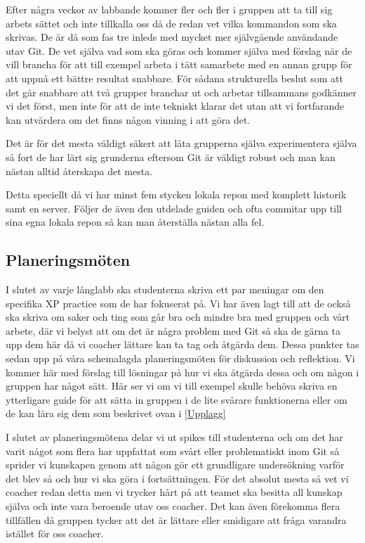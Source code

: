 Efter några veckor av labbande kommer fler och fler i gruppen att ta till sig arbets sättet och inte tillkalla oss då de redan vet vilka kommandon som ska skrivas. De är då som fas tre inleds med mycket mer självgående användande utav Git. De vet själva vad som ska göras och kommer själva med förslag när de vill brancha för att till exempel arbeta i tätt samarbete med en annan grupp för att uppnå ett bättre resultat snabbare. För sådana strukturella beslut som att det går snabbare att två grupper branchar ut och arbetar tillsammans godkänner vi det först, men inte för att de inte tekniskt klarar det utan att vi fortfarande kan utvärdera om det finns någon vinning i att göra det.

Det är för det mesta väldigt säkert att låta grupperna själva experimentera själva så fort de har lärt sig grunderna eftersom Git är väldigt robust och man kan nästan alltid återskapa det mesta.

Detta speciellt då vi har minst fem stycken lokala repon med komplett historik samt en server. Följer de även den utdelade guiden och ofta commitar upp till sina egna lokala repon så kan man återställa nästan alla fel.

\subsection{Planeringsmöten}

I slutet av varje långlabb ska studenterna skriva ett par meningar om den specifika XP practice som de har fokuserat på. Vi har även lagt till att de också ska skriva om saker och ting som går bra och mindre bra med gruppen och vårt arbete, där vi belyst att om det är några problem med Git så ska de gärna ta upp dem här då vi coacher lättare kan ta tag och åtgärda dem. Dessa punkter tas sedan upp på våra schemalagda planeringsmöten för diskussion och reflektion. Vi kommer här med förslag till lösningar på hur vi ska åtgärda dessa och om någon i gruppen har något sätt. Här ser vi om vi till exempel skulle behöva skriva en ytterligare guide för att sätta in gruppen i de lite svårare funktionerna eller om de kan lära sig dem som beskrivet ovan i \ref{Upplagg} 

I slutet av planeringsmötena delar vi ut spikes till studenterna och om det har varit något som flera har uppfattat som svårt eller problematiskt inom Git så sprider vi kunskapen genom att någon gör ett grundligare undersökning varför det blev så och hur vi ska göra i fortsättningen. För det absolut mesta så vet vi coacher redan detta men  vi trycker hårt på att teamet ska besitta all kunskap själva och inte vara beroende utav oss coacher. Det kan även förekomma flera tillfällen då gruppen tycker att det är lättare eller smidigare att fråga varandra istället för oss coacher.

